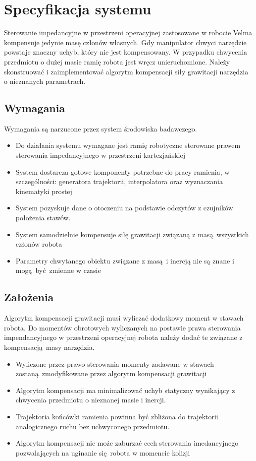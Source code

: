 
\chapter{Specyfikacja systemu \label{chap:specyfikacja_systemu}}
Sterowanie impedancyjne w przestrzeni operacyjnej zastosowane w robocie Velma kompensuje jedynie masę członów własnych. Gdy manipulator chwyci narzędzie powstaje znaczny uchyb, który nie jest kompensowany. W przypadku chwycenia przedmiotu o dużej masie ramię robota jest wręcz unieruchomione. Należy skonstruować i zaimplementować algorytm kompensacji siły grawitacji narzędzia o nieznanych parametrach. 

\section{Wymagania}
Wymagania są narzucone przez system środowiska badawczego.
\begin{itemize}
	\item Do działania systemu wymagane jest ramię robotyczne sterowane prawem sterowania impedancyjnego w przestrzeni kartezjańskiej
	\item System dostarcza gotowe komponenty potrzebne do pracy ramienia, w szczególności: generatora trajektorii, interpolatora oraz wyznaczania kinematyki prostej 
	\item System pozyskuje dane o otoczeniu na podstawie odczytów z czujników położenia stawów.
	\item System samodzielnie kompensuje siłę grawitacji związaną z masą wszystkich członów robota
	\item Parametry chwytanego obiektu związane z masą i inercją nie są znane i mogą być zmienne w czasie
\end{itemize}

\section{Założenia}
Algorytm kompensacji grawitacji musi wyliczać dodatkowy moment w stawach robota. Do momentów obrotowych wyliczanych na postawie  prawa sterowania impendancyjnego w przestrzeni operacyjnej robota należy dodać te związane z kompensacją masy narzędzia.
\begin{itemize}
	\item Wyliczone przez prawo sterowania momenty zadawane w stawach zostaną zmodyfikowane przez algorytm kompensacji grawitacji
	\item Algorytm kompensacji ma minimalizować uchyb statyczny wynikający z chwycenia przedmiotu o nieznanej masie i inercji.
	\item  Trajektoria końcówki ramienia powinna być zbliżona do trajektorii analogicznego ruchu bez uchwyconego przedmiotu.
	\item Algorytm kompensacji nie może zaburzać cech sterowania imedancyjnego pozwalających na uginanie się robota w momencie kolizji
\end{itemize}


